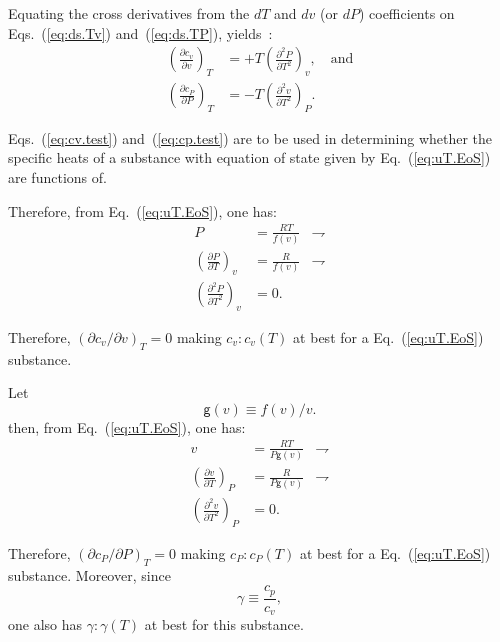 \documentclass[fleqn,11pt]{SelfArx}
\newcommand{\parxyz}[3]{\left(\frac{\partial {{#1}}}{\partial {{#2}}}\right)_{\!\!\!{#3}}}
\newcommand{\inlxyz}[3]{({\partial {{#1}}}/{\partial {{#2}}})_{{#3}}}
\begin{document}
    Equating  the  cross  derivatives  from  the  $dT$  and  $dv$  (or  $dP$)  coefficients   on
    Eqs.~(\ref{eq:ds.Tv}) and~(\ref{eq:ds.TP}), yields~\cite{2013-CengelYA+BolesMA-AMGH}:
    \begin{align}
        \parxyz{c_v}vT & = +T\left(\frac{\partial^2P}{\partial T^2}\right)_{\!\!\!v},
        \quad\mbox{and}\label{eq:cv.test} \\
        \parxyz{c_P}PT & = -T\left(\frac{\partial^2v}{\partial T^2}\right)_{\!\!\!P}.
        \label{eq:cp.test}
    \end{align}

    Eqs.~(\ref{eq:cv.test}) and~(\ref{eq:cp.test}) are to be used  in  determining  whether  the
    specific heats of a substance with equation of  state  given  by  Eq.~(\ref{eq:uT.EoS})  are
    functions of.

    Therefore, from Eq.~(\ref{eq:uT.EoS}), one has:
    \begin{align}
        P & = \frac{RT}{f(v)} & \rightharpoondown \\
        \parxyz PTv & = \frac{R}{f(v)} & \rightharpoondown \\
        \left(\frac{\partial^2P}{\partial T^2}\right)_{\!\!\!v} & = 0.
        \label{eq:cv.test.0}
    \end{align}

    Therefore, $\inlxyz{c_v}vT = 0$ making $c_v\!:\!c_v(T)$ at best for a  Eq.~(\ref{eq:uT.EoS})
    substance.

    Let
    \begin{equation}
        \mathsf{g}(v) \equiv f(v)/v.
        \label{eq:def.g}
    \end{equation}
    \noindent then, from Eq.~(\ref{eq:uT.EoS}), one has:
    \begin{align}
        v & = \frac{RT}{P\mathsf{g}(v)} & \rightharpoondown \\
        \parxyz vTP & = \frac{R}{P\mathsf{g}(v)} & \rightharpoondown
        \label{eq:vTP} \\
        \left(\frac{\partial^2v}{\partial T^2}\right)_{\!\!\!P} & = 0.
        \label{eq:cp.test.0}
    \end{align}

    Therefore, $\inlxyz{c_P}PT = 0$ making $c_P\!:\!c_P(T)$ at best for a  Eq.~(\ref{eq:uT.EoS})
    substance. Moreover, since
    \begin{equation}
        \gamma \equiv \frac{c_p}{c_v},
        \label{eq:def.gamma}
    \end{equation}
    \noindent one also has $\gamma\!:\!\gamma(T)$ at best for this substance.
\end{document}
